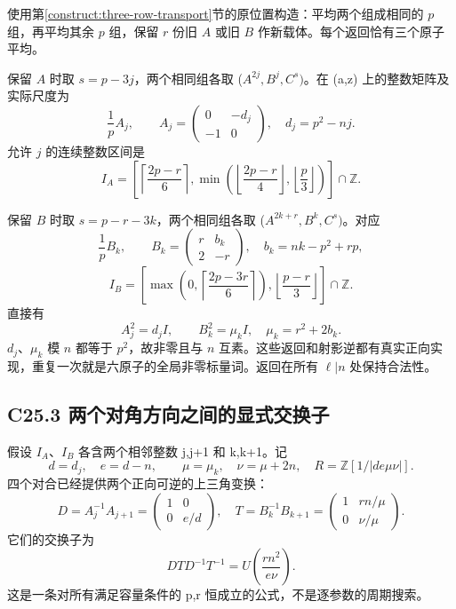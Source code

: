 \documentclass[11pt,a4paper]{article}
\theoremstyle{definition}
\numberwithin{equation}{section}
\begin{document}
{使用}第\ref{construct:three-row-transport}节{的原位置构造：平均两个组成相同的} {\ensuremath{p}} {组，再平均其余} {\ensuremath{p}} {组，保留} {\ensuremath{r}} {份旧} {\ensuremath{A}} {或旧} {\ensuremath{B}} {作新载体。每个返回恰有三个原子平均。}

{保留} {\ensuremath{A}} {时取} {\ensuremath{s=p-3j}，两个相同组各取} {(\ensuremath{A^{2j},B^{j},C^{s})}。在} {(a,z)} {上的整数矩阵及实际尺度为} \[
\frac1p A_j,\qquad
A_j=\begin{pmatrix}0&-d_j\\-1&0\end{pmatrix},
\quad d_j=p^2-nj.
\tag{C25.2}
\] {允许} {\ensuremath{j}} {的连续整数区间是} \[
I_A=\left[
\left\lceil\frac{2p-r}{6}\right\rceil,
\min\left(\left\lfloor\frac{2p-r}{4}\right\rfloor,
\left\lfloor\frac p3\right\rfloor\right)\right]\cap\mathbb Z.
\tag{C25.3}
\]

{保留} {\ensuremath{B}} {时取} {\ensuremath{s=p-r-3k}，两个相同组各取} {(\ensuremath{A^{2k+r},B^{k},C^{s})}。对应} \[
\frac1p B_k,\qquad
B_k=\begin{pmatrix}r&b_k\\2&-r\end{pmatrix},
\quad b_k=nk-p^2+rp,
\tag{C25.4}
\] \[
I_B=\left[
\max\left(0,\left\lceil\frac{2p-3r}{6}\right\rceil\right),
\left\lfloor\frac{p-r}{3}\right\rfloor\right]\cap\mathbb Z.
\tag{C25.5}
\] {直接有} \[
A_j^2=d_j I,\qquad B_k^2=\mu_k I,
\quad \mu_k=r^2+2b_k.
\] {\ensuremath{d_{j}}、\ensuremath{\mu _{k}}} {模} {\ensuremath{n}} {都等于} {\ensuremath{p^{2}}，故非零且与} {\ensuremath{n}} {互素。这些返回和射影逆都有真实正向实现，重复一次就是六原子的全局非零标量词。返回在所有} {\ensuremath{\ell |n}} {处保持合法性。}

\subsection*{\texorpdfstring{{C25.3} {两个对角方向之间的显式交换子}}{C25.3 两个对角方向之间的显式交换子}}\label{C25-h156}

{假设} {\ensuremath{I_{A}}、\ensuremath{I_{B}}} {各含两个相邻整数} {j,j+1} {和} {k,k+1。记} \[
d=d_j,\quad e=d-n,\qquad
\mu=\mu_k,\quad\nu=\mu+2n,
\quad R=\mathbb Z[1/|de\mu\nu|].
\] {四个对合已经提供两个正向可逆的上三角变换：} \[
D=A_j^{-1}A_{j+1}
=\begin{pmatrix}1&0\\0&e/d\end{pmatrix},
\quad
T=B_k^{-1}B_{k+1}
=\begin{pmatrix}1&rn/\mu\\0&\nu/\mu\end{pmatrix}.
\tag{C25.6}
\] {它们的交换子为} \[
\boxed{DTD^{-1}T^{-1}=U\left(\frac{rn^2}{e\nu}\right).}
\tag{C25.7}
\] {这是一条对所有满足容量条件的} {p,r} {恒成立的公式，不是逐参数的周期搜索。}
\end{document}
